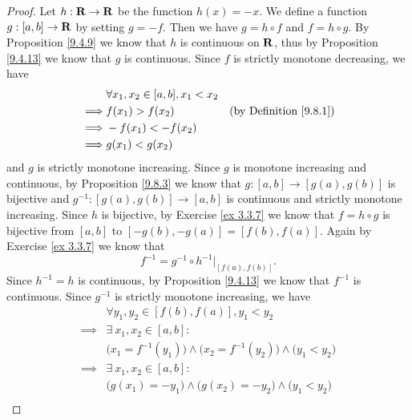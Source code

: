 \begin{proof}
    Let \(h : \mathbf{R} \to \mathbf{R}\) be the function \(h(x) = -x\).
    We define a function \(g : [a, b] \to \mathbf{R}\) by setting \(g = -f\).
    Then we have \(g = h \circ f\) and \(f = h \circ g\).
    By Proposition \ref{9.4.9} we know that \(h\) is continuous on \(\mathbf{R}\), thus by Proposition \ref{9.4.13} we know that \(g\) is continuous.
    Since \(f\) is strictly monotone decreasing, we have
    \begin{align*}
                 & \forall x_1, x_2 \in [a, b], x_1 < x_2                                      \\
        \implies & f(x_1) > f(x_2)                        & \text{(by Definition \ref{9.8.1})} \\
        \implies & -f(x_1) < -f(x_2)                                                           \\
        \implies & g(x_1) < g(x_2)
    \end{align*}
    and \(g\) is strictly monotone increasing.
    Since \(g\) is monotone increasing and continuous, by Proposition \ref{9.8.3} we know that \(g : [a, b] \to [g(a), g(b)]\) is bijective and \(g^{-1} : [g(a), g(b)] \to [a, b]\) is continuous and strictly monotone increasing.
    Since \(h\) is bijective, by Exercise \ref{ex 3.3.7} we know that \(f = h \circ g\) is bijective from \([a, b]\) to \([-g(b), -g(a)] = [f(b), f(a)]\).
    Again by Exercise \ref{ex 3.3.7} we know that
    \[
        f^{-1} = g^{-1} \circ h^{-1}|_{[f(a), f(b)]}.
    \]
    Since \(h^{-1} = h\) is continuous, by Proposition \ref{9.4.13} we know that \(f^{-1}\) is continuous.
    Since \(g^{-1}\) is strictly monotone increasing, we have
    \begin{align*}
                 & \forall y_1, y_2 \in [f(b), f(a)], y_1 < y_2                                                                                 \\
        \implies & \exists\ x_1, x_2 \in [a, b] :                                                                                               \\
                 & \big(x_1 = f^{-1}(y_1)\big) \land \big(x_2 = f^{-1}(y_2)\big) \land \big(y_1 < y_2\big)                                      \\
        \implies & \exists\ x_1, x_2 \in [a, b] :                                                                                               \\
                 & \big(g(x_1) = -y_1\big) \land \big(g(x_2) = -y_2\big) \land \big(y_1 < y_2\big)                                              \\

\end{align*}
\end{proof}
